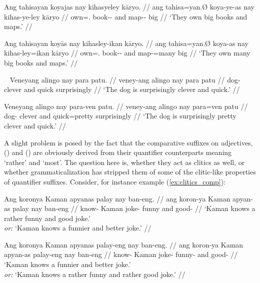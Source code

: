 \pex\label{ex:clitics_61}
\a\label{ex:clitics_61a}\begingl
	\gla Ang tahisayan koyajas nay kihasyeley kāryo. //
	\glb ang tahisa=yan.Ø koya-ye-as nay kihas-ye-ley kāryo //
	\glc \AgtT{} own=\TplM{}.\Top{} book-\Pl{}-\Parg{} and map-\Pl{}-\PargI{}
		big //
	\glft `They own big books and maps.' //
\endgl

\a\label{ex:clitics_61b}\begingl
	\gla Ang tahisayan koyās nay kihasley-ikan kāryo. //
	\glb ang tahisa=yan.Ø koya-as nay kihas-ley=ikan kāryo //
	\glc \AgtT{} own=\TplM{}.\Top{} book-\Pl{}-\Parg{} and map-\PargI{}=many 
		big //
	\glft `They own many big books and maps.' //
\endgl
\xe

\pex~\label{ex:clitics_62}
\a\label{ex:clitics_62a}\begingl
	\gla Veneyang alingo nay para patu. //
	\glb veney-ang alingo nay para patu //
	\glc dog-\Aarg{} clever and quick surprisingly //
	\glft `The dog is surprisingly clever and quick.' //
\endgl

\a\label{ex:clitics_62b}\begingl
	\gla Veneyang alingo nay para-ven patu. //
	\glb veney-ang alingo nay para=ven patu //
	\glc dog-\Aarg{} clever and quick=pretty surprisingly //
	\glft `The dog is surprisingly pretty clever and quick.' //
\endgl
\xe

A slight problem is posed by the fact that the comparative suffixes on
adjectives,  (\Comp{}) and  (\Supl{}) are
obviously derived from their quantifier counterparts meaning `rather' and
`most'. The question here is, whether they act as clitics as well, or whether
grammaticalization has stripped them of some of the clitic-like properties of
quantifier suffixes. Consider, for instance example (\ref{ex:clitics_comp}):

\pex\label{ex:clitics_comp}
\a\label{ex:clitics_comp1}\begingl
	\gla Ang koronya Kaman apyanas palay nay ban-eng. //
	\glb ang koron-ya Kaman apyan-as palay nay ban-eng //
	\glc \AgtT{} know-\TsgM{} Kaman joke-\Parg{} funny and good-\Comp{} //
	\glft `Kaman knows a rather funny and good joke.' \\
		\textit{or:} `Kaman knows a funnier and better joke.' //
\endgl

\a\label{ex:clitics_comp2}\begingl
	\gla Ang koronya Kaman apyanas palay-eng nay ban-eng. //
	\glb ang koron-ya Kaman apyan-as palay-eng nay ban-eng //
	\glc \AgtT{} know-\TsgM{} Kaman joke-\Parg{} funny-\Comp{} and 
		good-\Comp{} //
	\glft `Kaman knows a funnier and better joke.' \\
		\textit{or:} `Kaman knows a rather funny and rather good joke.' //
\endgl

